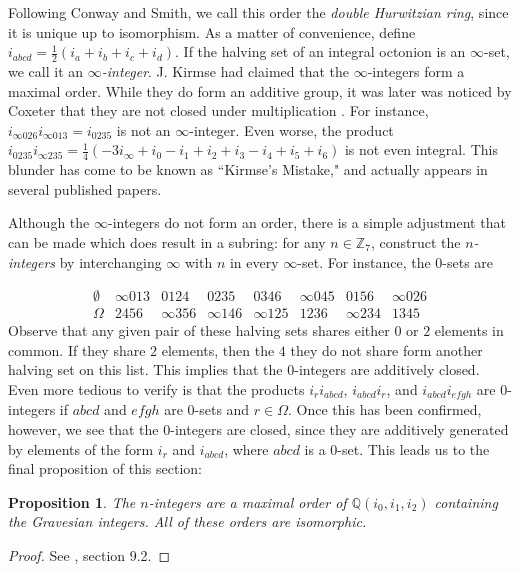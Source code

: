 \documentclass[10pt]{amsart}
\newcommand{\Q}{\mathbb{Q}}
\newcommand{\Z}{\mathbb{Z}}
\newtheorem{prop}[thm]{Proposition}
\begin{document}
Following Conway and Smith, we call this order the \emph{double Hurwitzian ring}, since it is unique up to isomorphism.  As a matter of convenience, define $i_{abcd} = \frac12 (i_a + i_b + i_c + i_d)$.  If the halving set of an integral octonion is an $\infty$-set, we call it an \emph{$\infty$-integer}.  J. Kirmse had claimed that the $\infty$-integers form a maximal order.  While they do form an additive group, it was later was noticed by Coxeter that they are not closed under multiplication \cite{Co46}.  For instance,
$i_{\infty 0 2 6} i_{\infty 0 1 3} = i_{0235}$ is not an $\infty$-integer.  Even worse, the product $i_{0235}i_{\infty235} = \frac14(-3i_\infty + i_0 - i_1 + i_2 + i_3 - i_4 + i_5 + i_6)$ is not even integral.  This blunder has come to be known as ``Kirmse's Mistake," and actually appears in several published papers.
 
Although the $\infty$-integers do not form an order, there is a simple adjustment that can be made which does result in a subring: for any $n \in \Z_7$, construct the \emph{$n$-integers} by interchanging $\infty$ with $n$ in every $\infty$-set.  For instance, the $0$-sets are

$$
\begin{array}{cccccccc}
\emptyset & \infty 0 1 3 & 0 1 2 4 & 0 2 3 5 & 0 3 4 6 & \infty 0 4 5 & 0 1 5 6 & \infty 0 2 6 \\ 
\Omega & 2 4 5 6 & \infty 3 5 6 & \infty 1 4 6 & \infty 1 2 5 & 1 2 3 6 & \infty 2 3 4 & 1 3 4 5
\end{array} 
$$
Observe that any given pair of these halving sets shares either $0$ or $2$ elements in common.  If they share $2$ elements, then the $4$ they do not share form another halving set on this list.  This implies that the $0$-integers are additively closed.  Even more tedious to verify is that the products $i_r i_{abcd}$, $i_{abcd}i_r$, and $i_{abcd}i_{efgh}$ are $0$-integers if $abcd$ and $efgh$ are $0$-sets and $r \in \Omega$.  Once this has been confirmed, however, we see that the $0$-integers are closed, since they are additively generated by elements of the form $i_r$ and $i_{abcd}$, where $abcd$ is a $0$-set.  This leads us to the final proposition of this section:

\begin{prop}
\normalfont
The $n$-integers are a maximal order of $\Q(i_0,i_1,i_2)$ containing the Gravesian integers.  All of these orders are isomorphic.
\end{prop}

\begin{proof}
See \cite{Co03}, section 9.2.
\end{proof}
\end{document}
